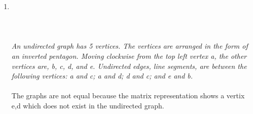 \documentclass{amsart}
\theoremstyle{definition}
\theoremstyle{Exercise}
\theoremstyle{remark}
\theoremstyle{rule}
\numberwithin{equation}{section}
\begin{document}
\begin{enumerate}[label=(\alph*)]
\newpage
 \item
\hfil
  \\\\
\\
\\
   {\color{blue}{\bf Figure 3:} \emph{An undirected graph has 5 vertices. The vertices are arranged in the form of an inverted pentagon. Moving clockwise from the top left vertex a, the other vertices are, b, c, d, and e. Undirected edges, line segments, are between the following vertices: a and c; a and d; d and c; and e and b. 
  \\\\
}
}
The graphs are not equal because the matrix representation shows a vertix {e,d} which does not exist in the undirected graph.

 \newpage

 \


\end{enumerate}
\end{document}
